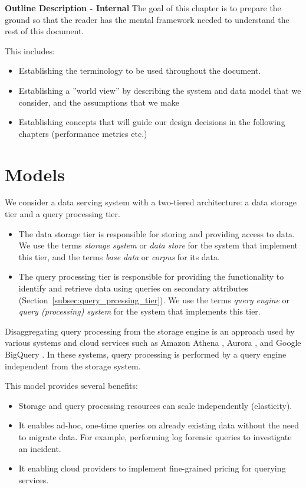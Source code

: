 \begin{tcolorbox}
\textbf{Outline Description - Internal}
The goal of this chapter is to prepare the ground so that the reader has the mental framework needed to understand the
rest of this document.

This includes:
\begin{itemize}
  \item Establishing the terminology to be used throughout the document.
  \item Establishing a ''world view'' by describing the system and data model that we consider, and the assumptions that
  we make
  \item Establishing concepts that will guide our design decisions in the following chapters (performance metrics etc.)
\end{itemize}
\end{tcolorbox}


\section{Models}
We consider a data serving system with a two-tiered architecture: a data storage tier and a query processing tier.

\begin{itemize}
  \item The data storage tier is responsible for storing and providing access to data.
  We use the terms \textit{storage system} or \textit{data store} for the system that implement this tier, and the terms
  \textit{base data} or \textit{corpus} for its data.

  \item The query processing tier is responsible for providing the functionality to identify and retrieve data using
  queries on secondary attributes (Section~\ref{subsec:query_prcessing_tier}).
  We use the terms \textit{query engine} or \textit{query (processing) system} for the system that implements this tier.
\end{itemize}

Disaggregating query processing from the storage engine is an approach used by various systems and cloud
services such as Amazon Athena \cite{aws:athena}, Aurora \cite{aws:aurora}, and Google BigQuery
\cite{google:bigquery}.
In these systems, query processing is performed by a query engine independent from the storage system.

This model provides several benefits:
\begin{itemize}
  \item Storage and query processing resources can scale independently (elasticity).
  \item It enables ad-hoc, one-time queries on already existing data without the need to migrate data.
  For example, performing log forensic queries to investigate an incident.
  \item It enabling cloud providers to implement fine-grained pricing for querying services.
\end{itemize}

